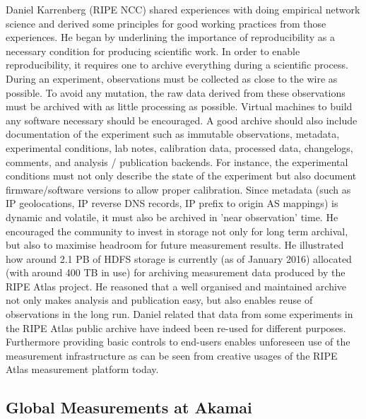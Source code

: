 Daniel Karrenberg (RIPE NCC) shared experiences with doing empirical network
science and derived some principles for good working practices from those
experiences.  He began by underlining the importance of reproducibility as a
necessary condition for producing scientific work. In order to enable
reproducibility, it requires one to archive everything during a scientific
process. During an experiment, observations must be collected as close to the
wire as possible.  To avoid any mutation, the raw data derived from these
observations must be archived with as little processing as possible. Virtual
machines to build any software necessary should be encouraged. A good archive
should also include documentation of the experiment such as immutable
observations, metadata, experimental conditions, lab notes, calibration data,
processed data, changelogs, comments, and analysis / publication backends. For
instance, the experimental conditions must not only describe the state of the
experiment but also document firmware/software versions to allow proper
calibration.  Since metadata (such as IP geolocations, IP reverse DNS records,
IP prefix to origin AS mappings) is dynamic and volatile, it must also be
archived in 'near observation' time.  He encouraged the community to invest in
storage not only for long term archival, but also to maximise headroom for
future measurement results. He illustrated how around 2.1 PB of \ac{HDFS}
\cite{twhite:oreilly:2015} storage is currently (as of January 2016) allocated
(with around 400 TB in use) for archiving measurement data produced by the RIPE
Atlas project. He reasoned that a well organised and maintained archive not
only makes analysis and publication easy, but also enables reuse of
observations in the long run.  Daniel related that data from some experiments
in the RIPE Atlas public archive have indeed been re-used for different
purposes. Furthermore providing basic controls to end-users enables unforeseen
use of the measurement infrastructure as can be seen from creative usages of
the RIPE Atlas measurement platform today.

\subsection{Global Measurements at Akamai}

